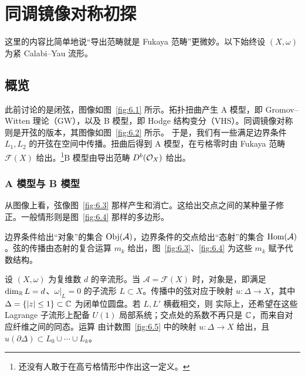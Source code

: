 \chapter{同调镜像对称初探}
这里的内容比简单地说“导出范畴就是 Fukaya 范畴”更微妙。以下始终设 $(X,\omega)$ 为紧 Calabi–Yau 流形。
\section{概览}
此前讨论的是闭弦，图像如图~\ref{fig:6.1} 所示。拓扑扭曲产生 A 模型，即 Gromov–Witten 理论（GW），以及 B 模型，即 Hodge 结构变分（VHS）。同调镜像对称则是开弦的版本，其图像如图~\ref{fig:6.2} 所示。
于是，我们有一些满足边界条件 $L_1,L_2$ 的开弦在空间中传播。扭曲后得到 A 模型，在亏格零时由 Fukaya 范畴 $\mathcal F(X)$ 给出。\footnote{还没有人敢于在高亏格情形中作出这一定义。}B 模型由导出范畴 $D^b(\mathcal O_X)$ 给出。
\subsection{A 模型与 B 模型}
从图像上看，弦像图~\ref{fig:6.3} 那样产生和消亡。这给出交点之间的某种量子修正。一般情形则是图~\ref{fig:6.4} 那样的多边形。

边界条件给出“对象”的集合 $\operatorname{Obj}(\mathcal A)$，边界条件的交点给出“态射”的集合 $\operatorname{Hom}(\mathcal A)$。弦的传播由态射的复合运算 $m_k$ 给出，图~\ref{fig:6.3}、\ref{fig:6.4} 为这些 $m_k$ 赋予代数结构。

设 $(X,\omega)$ 为复维数 $d$ 的辛流形。当 $\mathcal A=\mathcal F(X)$ 时，对象是，即满足 $\dim_{\mathbb R} L=d$、$\omega|_L=0$ 的子流形 $L\subset X$。传播中的弦对应于映射 $u:\Delta\to X$，其中 $\Delta=\{|z|\le1\}\subset\mathbb C$ 为闭单位圆盘。若 $L,L'$ 横截相交，则
实际上，还希望在这些 Lagrange 子流形上配备 $U(1)$ 局部系统；交点处的系数不再只是 $\mathbb C$，而来自对应纤维之间的同态。运算
由计数图~\ref{fig:6.5} 中的映射 $u:\Delta\to X$ 给出，且 $u(\partial\Delta)\subset L_0\cup\cdots\cup L_k$。

